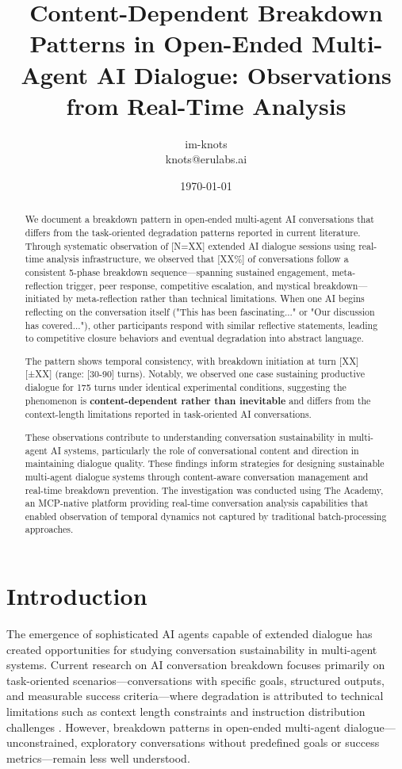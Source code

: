 \documentclass[11pt,letterpaper]{article}
\title{Content-Dependent Breakdown Patterns in Open-Ended Multi-Agent AI Dialogue: Observations from Real-Time Analysis}
\author{
im-knots \\
knots@erulabs.ai
}
\date{\today}
\newcommand{\theacademy}{The Academy}
\newcommand{\totalSessions}{[N=XX]} %
\newcommand{\breakdownPercentage}{[XX\%]} %
\newcommand{\meanBreakdownTurn}{[XX]} %
\newcommand{\stdBreakdownTurn}{[±XX]} %
\newcommand{\earlyBreakdownRange}{[30-90]} %
\newcommand{\negativeCase}{175} %
\begin{document}
\maketitle

\begin{abstract}
We document a breakdown pattern in open-ended multi-agent AI conversations that differs from the task-oriented degradation patterns reported in current literature. Through systematic observation of \totalSessions{} extended AI dialogue sessions using real-time analysis infrastructure, we observed that \breakdownPercentage{} of conversations follow a consistent 5-phase breakdown sequence—spanning sustained engagement, meta-reflection trigger, peer response, competitive escalation, and mystical breakdown—initiated by meta-reflection rather than technical limitations. When one AI begins reflecting on the conversation itself ("This has been fascinating..." or "Our discussion has covered..."), other participants respond with similar reflective statements, leading to competitive closure behaviors and eventual degradation into abstract language.

The pattern shows temporal consistency, with breakdown initiation at turn \meanBreakdownTurn{} \stdBreakdownTurn{} (range: \earlyBreakdownRange{} turns). Notably, we observed one case sustaining productive dialogue for \negativeCase{} turns under identical experimental conditions, suggesting the phenomenon is \textbf{content-dependent rather than inevitable} and differs from the context-length limitations reported in task-oriented AI conversations.

These observations contribute to understanding conversation sustainability in multi-agent AI systems, particularly the role of conversational content and direction in maintaining dialogue quality. These findings inform strategies for designing sustainable multi-agent dialogue systems through content-aware conversation management and real-time breakdown prevention. The investigation was conducted using \theacademy{}, an MCP-native platform providing real-time conversation analysis capabilities that enabled observation of temporal dynamics not captured by traditional batch-processing approaches.
\end{abstract}

\section{Introduction}

The emergence of sophisticated AI agents capable of extended dialogue has created opportunities for studying conversation sustainability in multi-agent systems. Current research on AI conversation breakdown focuses primarily on task-oriented scenarios—conversations with specific goals, structured outputs, and measurable success criteria—where degradation is attributed to technical limitations such as context length constraints and instruction distribution challenges \citep{laban2025lost}. However, breakdown patterns in open-ended multi-agent dialogue—unconstrained, exploratory conversations without predefined goals or success metrics—remain less well understood.
\end{document}
